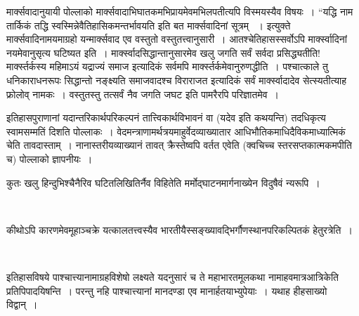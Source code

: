 मार्क्सवादानुयायी पोल्लाको मार्क्सवादाभिघातकमभिप्रायमेवमभिलपतीत्यपि विस्मयस्यैव विषयः~। “यद्धि नाम तार्किकं तद्धि स्वस्मिन्नेवैतिहासिकमन्तर्भावयति  इति बत मार्क्सवादिनां सूत्रम् ~। इत्युक्ते मार्क्सवादिनामयमाग्रहो यन्मार्क्सवाद एव वस्तुतो वस्तुतत्त्वानुसारी~। आतश्चेतिहासस्सर्वोऽपि मार्क्स्वादिनां नयमेवानुसृत्य घटिष्यत इति~। मार्क्स्वादसिद्धान्तानुसारमेव खलु जगति सर्वं सर्वदा प्रसिद्ध्यतीति! मार्क्स्तर्कस्य महिमाऽयं यद्राज्यं समाज इत्यादिकं सर्वमपि मार्क्स्तर्कमेवानुरुणद्धीति~। पश्चात्काले तु धनिकाराधनरूपः  सिद्धान्तो नङ्क्ष्यति समाजवादश्च विराराजत इत्यादिकं सर्वं मार्क्स्वादादेव सेत्स्यतीत्याह फ्रोलोव्  नामकः~। वस्तुतस्तु तत्सर्वं नैव जगति जघट इति पामरैरपि परिज्ञातमेव~।

इतिहासपुराणानां यदान्तरिकार्थपरिकल्पनं तात्त्विकार्थविभावनं वा (यदेव  इति कथयन्ति) तदधिकृत्य स्वामसम्मतिं दिशति पोल्लाकः~। वेदमन्त्राणामर्थत्रयमाहुर्वेदव्याख्यातार आधिभौतिकमाधिदैविकमाध्यात्मिकं चेति तावदास्ताम्~। नानास्तरीयव्याख्यानं तावत् क्रैस्तेष्वपि वर्तत एवेति (क्वचिच्च स्तरसप्तकात्मकमपीति च) पोल्लाको ज्ञापनीयः~।

कुतः खलु हिन्दुभिश्चैनैरिव घटितलिखितिर्नैव विहितेति मर्मोद्घाटनमार्गनाख्येन विदुषैवं न्यरूपि~।

\begin{myquote}

~\hfill {}
\end{myquote}

कीथोऽपि कारणमेवमूहाञ्चक्रे यत्कालतत्त्वस्यैव भारतीयैस्सङ्ख्यावद्भिर्गौणस्थानपरिकल्पितकं हेतुरत्रेति~।

\begin{myquote}

~\hfill {}
\end{myquote}

इतिहासविषये पाश्चात्त्यानामाग्रहविशेषो लक्ष्यते यदनुसारं च ते महाभारतमूलकथा नामाहवमात्रआत्रिकेति प्रतिपिपादयिषन्ति~। परन्तु नहि पाश्चात्त्यानां मानदण्डा एव मानार्हतयाभ्युपेयाः~। यथाह हीहसाख्यो विद्वान्~।

